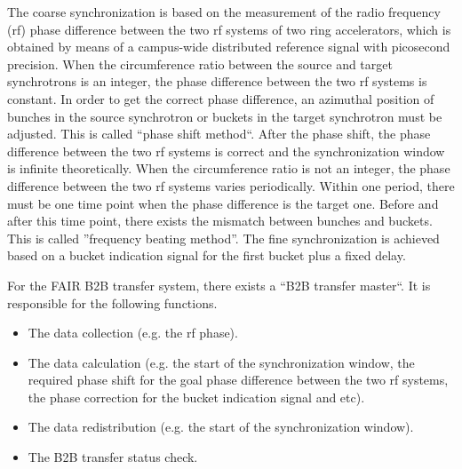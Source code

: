 The coarse synchronization is based on the measurement of the radio frequency (rf) phase difference between the two rf systems of two ring accelerators, which is obtained by means of a campus-wide distributed reference signal with picosecond precision. When the circumference ratio between the source and target synchrotrons is an integer, the phase difference between the two rf systems is constant. In order to get the correct phase difference, an azimuthal position of bunches in the source synchrotron or buckets in the target synchrotron must be adjusted. This is called “phase shift method“. After the phase shift, the phase difference between the two rf systems is correct and the synchronization window is infinite theoretically. When the circumference ratio is not an integer, the phase difference between the two rf systems varies periodically. Within one period, there must be one time point when the phase difference is the target one. Before and after this time point, there exists the mismatch between bunches and buckets. This is called ”frequency beating method”. The fine synchronization is achieved based on a bucket indication signal for the first bucket plus a fixed delay. 

For the FAIR B2B transfer system, there exists a “B2B transfer master“. It is responsible for the following functions. 
\begin{itemize}

	\item 	The data collection (e.g. the rf phase). 
   \item 	The data calculation (e.g. the start of the synchronization window, the required phase shift for the goal phase difference between the two rf systems, the phase correction for the bucket indication signal and etc). 
   \item 	The data redistribution (e.g. the start of the synchronization window).
	\item The B2B transfer status check.
\end{itemize}


